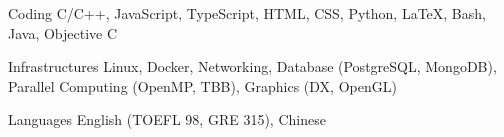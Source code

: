 

\begin{cvskills}

  \cvskill
    {Coding} %
    {C/C++, JavaScript, TypeScript, HTML, CSS, Python, LaTeX, Bash, Java, Objective C} %

  \cvskill
    {Infrastructures} %
    {Linux, Docker, Networking, Database (PostgreSQL, MongoDB), Parallel Computing (OpenMP, TBB), Graphics (DX, OpenGL)} %

  \cvskill
    {Languages} %
    {English (TOEFL 98, GRE 315), Chinese} %

\end{cvskills}
